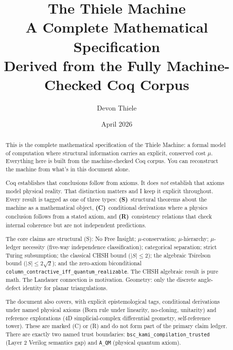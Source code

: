 \documentclass[11pt, a4paper]{report}
\title{\textbf{The Thiele Machine}\\ \large A Complete Mathematical Specification\\[6pt] \normalsize Derived from the Fully Machine-Checked Coq Corpus}
\author{Devon Thiele}
\date{April 2026}
\theoremstyle{definition}
\theoremstyle{plain}
\begin{document}
\maketitle

\begin{abstract}
This is the complete mathematical specification of the Thiele Machine: a formal model of computation where structural information carries an explicit, conserved cost $\mu$. Everything here is built from the machine-checked Coq corpus. You can reconstruct the machine from what's in this document alone.

Coq establishes that conclusions follow from axioms. It does \emph{not} establish that axioms model physical reality. That distinction matters and I keep it explicit throughout. Every result is tagged as one of three types: \textbf{(S)}~structural theorems about the machine as a mathematical object, \textbf{(C)}~conditional derivations where a physics conclusion follows from a stated axiom, and \textbf{(R)}~consistency relations that check internal coherence but are not independent predictions.

The core claims are structural (S): No Free Insight; $\mu$-conservation; $\mu$-hierarchy; $\mu$-ledger necessity (five-way independence classification); categorical separation; strict Turing subsumption; the classical CHSH bound ($|S| \leq 2$); the algebraic Tsirelson bound ($|S| \leq 2\sqrt{2}$); and the zero-axiom biconditional \texttt{column\_contractive\_iff\_quantum\_realizable}. The CHSH algebraic result is pure math. The Landauer connection is motivation. Geometry: only the discrete angle-defect identity for planar triangulations.

The document also covers, with explicit epistemological tags, conditional derivations under named physical axioms (Born rule under linearity, no-cloning, unitarity) and reference explorations (4D simplicial-complex differential geometry, self-reference tower). These are marked (C) or (R) and do not form part of the primary claim ledger. There are exactly two named trust boundaries: \texttt{bsc\_kami\_compilation\_trusted} (Layer 2 Verilog semantics gap) and \texttt{A\_QM} (physical quantum axiom).
\end{abstract}

\tableofcontents

\end{document}
